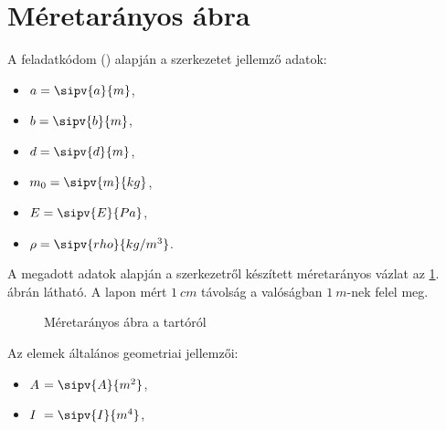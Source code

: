 \section{Méretarányos ábra}

A feladatkódom (\texttt{})
alapján a szerkezetet jellemző adatok:
\begin{multicols}{2}
  \begin{itemize}
    \item $a = \sipv{a}{m}$,
    \item $b = \sipv{b}{m}$,
    \item $d = \sipv{d}{m}$,

    \item $m_0 = \sipv{m}{kg}$,
    \item $\siplaces{1}\sisci{}E = \sipv{E}{Pa}$,
    \item $\rho = \sipv{rho}{kg/m^3}$.
  \end{itemize}
\end{multicols}

A megadott adatok alapján a szerkezetről készített méretarányos vázlat az
\ref{fig:construction}. ábrán látható. A lapon mért $\SI{1}{cm}$ távolság
a valóságban $\SI{1}{m}$-nek felel meg.

\begin{figure}[H]
  \centering
  
  \caption{Méretarányos ábra a tartóról}
  \label{fig:construction}
\end{figure}

Az elemek általános geometriai jellemzői:
\begin{itemize}
  \sisci
  \item $A\phantom{I}\hspace{-1.5mm} = \sipv{A}{m^2}$,
  \item $I\phantom{A}\hspace{-1.5mm} = \sipv{I}{m^4}$,
\end{itemize}
